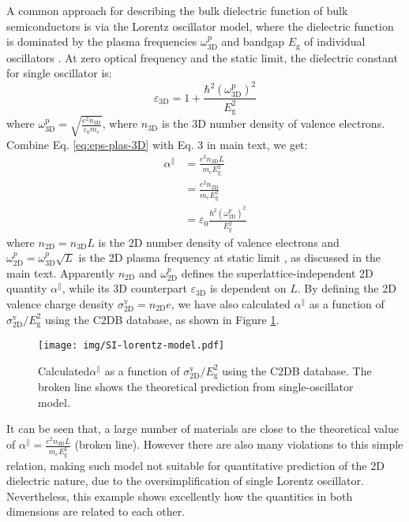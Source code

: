 \documentclass[manuscript=suppinfo,email=true,hyperref=true,keywords=false]{achemso}
\begin{document}
A common approach for describing the bulk dielectric function of bulk
semiconductors is via the Lorentz oscillator model, where the
dielectric function is dominated by the plasma frequencies
$\omega_{\mathrm{3D}}^{\mathrm{p}}$ and bandgap $E_{\mathrm{g}}$ of
individual oscillators \cite{ketterson_physics_2016}. At zero optical
frequency and the static limit, the dielectric constant for single
oscillator is:
\begin{equation}
  \label{eq:eps-plas-3D}
  \varepsilon_{\mathrm{3D}} = 1 +
  \frac{\hbar^{2} (\omega_{\mathrm{3D}}^{\mathrm{p}})^{2}}{E_{\mathrm{g}}^{2}}
\end{equation}
where
$\omega_{\mathrm{3D}}^{\mathrm{p}} = {\displaystyle \sqrt{\frac{e^{2}
      n_{\mathrm{3D}}}{\varepsilon_{0} m_{e}}}}$, where
$n_{\mathrm{3D}}$ is the 3D number density of valence
electrons. Combine Eq. \ref{eq:eps-plas-3D} with Eq. 3 in main text,
we get:
\begin{equation}
  \begin{aligned}
  \label{eq:alpha-plas}
  \alpha^{\parallel} &= \frac{e^{2} n_{\mathrm{3D}} L}{m_{e} E_{\mathrm{g}}^{2}} \\
  &= \frac{e^{2} n_{\mathrm{2D}}}{m_{e} E_{\mathrm{g}}^{2}} \\
  &= \varepsilon_{0} \frac{\hbar^{2}
    (\omega_{\mathrm{2D}}^{\mathrm{p}})^{2}}{E_{\mathrm{g}}^{2}}
\end{aligned}
\end{equation}
where $n_{\mathrm{2D}} =n_{\mathrm{3D}} L$ is the 2D number density of
valence electrons and
$\omega_{\mathrm{2D}}^{p}=\omega_{\mathrm{3D}}^{p}\sqrt{L}$ is the 2D
plasma frequency at static limit \cite{Nazarov_2015_2D_3D}, as
discussed in the main text. Apparently $n_{\mathrm{2D}}$ and
$\omega_{\mathrm{2D}}^{p}$ defines the superlattice-independent 2D
quantity $\alpha^{\parallel}$, while its 3D counterpart
$\varepsilon_{\mathrm{3D}}$ is dependent on $L$. By defining the 2D
valence charge density
$\sigma_{\mathrm{2D}}^{\mathrm{v}}=n_{\mathrm{2D}}e$, we have also
calculated $\alpha^{\parallel}$ as a function of
$\sigma_{\mathrm{2D}}^{\mathrm{v}}/E_{\mathrm{g}}^{2}$ using the C2DB database, as shown in Figure \ref{fig:plasma}.
\begin{figure}[htbp]
  \centering
  \texttt{[image: img/SI-lorentz-model.pdf]}
  \caption{Calculated$\alpha^{\parallel}$ as a function of
    $\sigma_{\mathrm{2D}}^{\mathrm{v}}/E_{\mathrm{g}}^{2}$ using the
    C2DB database. The broken line shows the theoretical prediction
    from single-oscillator model.}
  \label{fig:plasma}
\end{figure}
It can be seen that, a large number of materials are close to the
theoretical value of
$\alpha^{\parallel} = \frac{e^{2} n_{\mathrm{3D}} L}{m_{e}
  E_{\mathrm{g}}^{2}}$ (broken line). However there are also many
violations to this simple relation, making such model not suitable for
quantitative prediction of the 2D dielectric nature, due to the
oversimplification of single Lorentz oscillator. Nevertheless, this
example shows excellently how the quantities in both dimensions are
related to each other.
\end{document}
